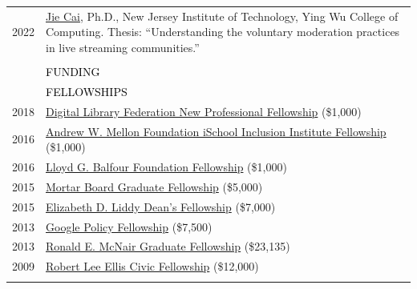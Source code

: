 \documentclass[12pt]{article}
\begin{document}
{\begin{longtable}{R{0.75in}p{5.0in}}
\footnotesize{2022} & \href{https://digitalcommons.njit.edu/dissertations/1594/}{Jie Cai}, Ph.D., New Jersey Institute of Technology, Ying Wu College of Computing. Thesis: ``Understanding the voluntary moderation practices in live streaming communities.'' \\ \\

\sout{\hfill} & \par \Large \textcolor{black}{\uppercase{Funding\hspace{6pt} \sout{\hfill}}} \medskip \\ 

& \large \textcolor{black}{\uppercase{Fellowships}}\\

\footnotesize{2018} & \href{https://forum2018.diglib.org/fellowship-opportunities/fellows/}{Digital Library Federation New Professional Fellowship} (\$1,000)\\

\footnotesize{2016} & \href{https://www.sis.pitt.edu/i3/phd-fellows/fellow-profiles.html}{Andrew W. Mellon Foundation iSchool Inclusion Institute Fellowship} (\$1,000)\\

\footnotesize{2016} & \href{https://www.bankofamerica.com/philanthropic/foundation.go?fnId=31}{Lloyd G. Balfour Foundation Fellowship} (\$1,000)\\

\footnotesize{2015} & \href{https://web.archive.org/web/20170822003712/https://news.syr.edu/2015/07/ischool-student-awarded-5000-mortar-board-fellowship-22021/}{Mortar Board Graduate Fellowship} (\$5,000)\\

\footnotesize{2015} & \href{https://web.archive.org/web/20170822003712/https://news.syr.edu/2015/07/ischool-student-awarded-5000-mortar-board-fellowship-22021/}{Elizabeth D. Liddy Dean's Fellowship} (\$7,000)\\

\footnotesize{2013} & \href{https://www.google.com/policyfellowship/2013fellows.html}{Google Policy Fellowship} (\$7,500)\\

\footnotesize{2013} & \href{https://www.syracuse.edu/admissions/cost-and-aid/types-of-aid/graduate-student-aid/fellowships/}{Ronald E. McNair Graduate Fellowship} (\$23,135)\\

\footnotesize{2009} & \href{https://www.washington.edu/uaa/2010/04/22/uw-celebrates-undergraduate-leadership-and-civic-engagement/}{Robert Lee Ellis Civic Fellowship} (\$12,000) \medskip \\ \pagebreak


\end{longtable}}
\end{document}
